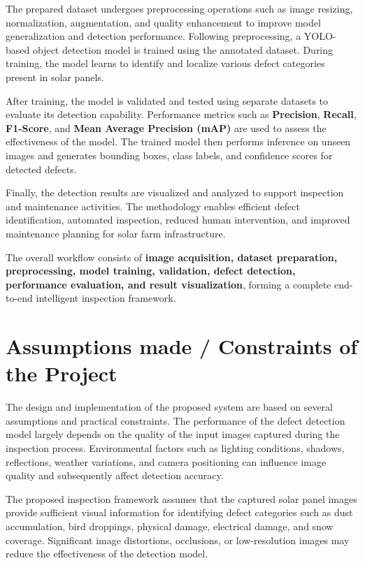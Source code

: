 The prepared dataset undergoes preprocessing operations such as image resizing, normalization, augmentation, and quality enhancement to improve model generalization and detection performance. Following preprocessing, a YOLO-based object detection model is trained using the annotated dataset. During training, the model learns to identify and localize various defect categories present in solar panels.

After training, the model is validated and tested using separate datasets to evaluate its detection capability. Performance metrics such as \textbf{Precision}, \textbf{Recall}, \textbf{F1-Score}, and \textbf{Mean Average Precision (mAP)} are used to assess the effectiveness of the model. The trained model then performs inference on unseen images and generates bounding boxes, class labels, and confidence scores for detected defects.

Finally, the detection results are visualized and analyzed to support inspection and maintenance activities. The methodology enables efficient defect identification, automated inspection, reduced human intervention, and improved maintenance planning for solar farm infrastructure.

The overall workflow consists of \textbf{image acquisition, dataset preparation, preprocessing, model training, validation, defect detection, performance evaluation, and result visualization}, forming a complete end-to-end intelligent inspection framework.

\section{Assumptions made / Constraints of the Project}

The design and implementation of the proposed system are based on several assumptions and practical constraints. The performance of the defect detection model largely depends on the quality of the input images captured during the inspection process. Environmental factors such as lighting conditions, shadows, reflections, weather variations, and camera positioning can influence image quality and subsequently affect detection accuracy.

The proposed inspection framework assumes that the captured solar panel images provide sufficient visual information for identifying defect categories such as dust accumulation, bird droppings, physical damage, electrical damage, and snow coverage. Significant image distortions, occlusions, or low-resolution images may reduce the effectiveness of the detection model.


